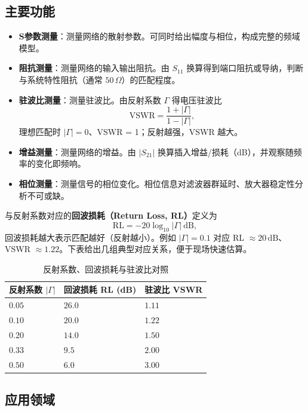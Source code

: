 \subsection{主要功能}

\begin{itemize}
    \item \textbf{S参数测量}：测量网络的散射参数。可同时给出幅度与相位，构成完整的频域模型。
    \item \textbf{阻抗测量}：测量网络的输入输出阻抗。由 $S_{11}$ 换算得到端口阻抗或导纳，判断与系统特性阻抗（通常 $50\,\Omega$）的匹配程度。
    \item \textbf{驻波比测量}：测量驻波比。由反射系数 $\Gamma$ 得电压驻波比
    \[
        \mathrm{VSWR} = \frac{1+|\Gamma|}{1-|\Gamma|} ,
    \]
    理想匹配时 $|\Gamma|=0$、VSWR = 1；反射越强，VSWR 越大。
    \item \textbf{增益测量}：测量网络的增益。由 $|S_{21}|$ 换算插入增益/损耗（dB），并观察随频率的变化即频响。
    \item \textbf{相位测量}：测量信号的相位变化。相位信息对滤波器群延时、放大器稳定性分析不可或缺。
\end{itemize}

与反射系数对应的\textbf{回波损耗（Return Loss, RL）}定义为
\[
    \mathrm{RL} = -20\log_{10}|\Gamma| \ \mathrm{dB} ,
\]
回波损耗越大表示匹配越好（反射越小）。例如 $|\Gamma|=0.1$ 对应 RL $\approx 20\,\mathrm{dB}$、VSWR $\approx 1.22$。下表给出几组典型对应关系，便于现场快速估算。

\begin{table}[htbp]
    \centering
    \caption{反射系数、回波损耗与驻波比对照}
    \begin{tabular}{|p{4.0cm}|p{4.4cm}|p{4.6cm}|}
        \hline
        \textbf{反射系数 $|\Gamma|$} & \textbf{回波损耗 RL (dB)} & \textbf{驻波比 VSWR} \\
        \hline
        $0.05$ & $26.0$ & $1.11$ \\
        \hline
        $0.10$ & $20.0$ & $1.22$ \\
        \hline
        $0.20$ & $14.0$ & $1.50$ \\
        \hline
        $0.33$ & $9.5$ & $2.00$ \\
        \hline
        $0.50$ & $6.0$ & $3.00$ \\
        \hline
    \end{tabular}
\end{table}

\subsection{应用领域}

